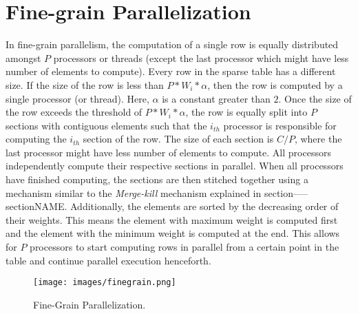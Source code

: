 \chapter{Fine-grain Parallelization}
\label{chap:finegrain}



In fine-grain parallelism, the computation of a single row is equally distributed amongst $P$ processors or threads (except the last processor which might have less number of elements to compute).  Every row in the sparse table has a different size.  If the size of the row is less than $P*W_{i}*\alpha$, then the row is computed by a single processor (or thread).  Here,  $\alpha$ is a constant greater than $2$.  Once the size of the row exceeds the threshold of $P*W_{i}*\alpha$, the row is equally split into $P$ sections with contiguous elements such that the $i_{th}$ processor is responsible for computing the $i_{th}$ section of the row.  The size of each section is $C/P$, where the last processor might have less number of elements to compute.  All processors independently compute their respective sections in parallel.  When all processors have finished computing, the sections are then stitched together using a mechanism similar to the \emph{Merge-kill} mechanism explained in section-----sectionNAME.  
Additionally, the elements are sorted by the decreasing order of their weights.  This means the element with maximum weight is computed first and the element with the minimum weight is computed at the end.  This allows for $P$ processors to start computing rows in parallel from a certain point in the table and continue parallel execution henceforth.  


\begin{figure}[htbp]
\centerline{\texttt{[image: images/finegrain.png]}}
\caption{Fine-Grain Parallelization. }
\label{fig:finegrain}
\end{figure}

